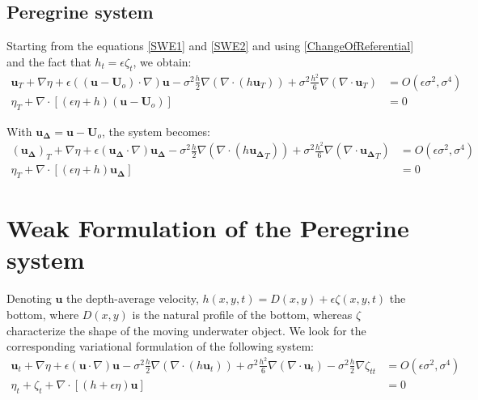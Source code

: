 \documentclass[11pt,a4paper]{article}
\begin{document}
		
		\pagebreak
		
		\subsection{Peregrine system}
			Starting from the equations \eqref{SWE1} and \eqref{SWE2} and using \eqref{ChangeOfReferential} and the fact that $h_t = \epsilon \zeta_t$, we obtain:
			\begin{align}
				\mathbf{u}_T + \nabla \eta		+ \epsilon ((\mathbf{u} - \mathbf{U}_o)\cdot \nabla) \mathbf{u}  - \sigma^2\frac{h}{2}\nabla (\nabla \cdot (h \mathbf{u}_T)) + \sigma^2 \frac{h^2}{6}\nabla (\nabla \cdot \mathbf{u}_T) &= O(\epsilon \sigma^2, \sigma^4)\\
				\eta_T + \nabla \cdot [(\epsilon \eta + h)(\mathbf{u} - \mathbf{U}_o)] &= 0
	\end{align}
	
		With $\mathbf{u_\Delta} = \mathbf{u} - \mathbf{U}_o$, the system becomes:
		\begin{align}
			(\mathbf{u_\Delta})_T + \nabla \eta		+ \epsilon (\mathbf{u_\Delta}\cdot \nabla) \mathbf{u_\Delta} - \sigma^2\frac{h}{2}\nabla (\nabla \cdot (h \mathbf{u_\Delta}_T)) + \sigma^2 \frac{h^2}{6}\nabla (\nabla \cdot \mathbf{u_\Delta}_T) &= O(\epsilon \sigma^2, \sigma^4)\\
			\eta_T + \nabla \cdot [(\epsilon \eta + h)\mathbf{u_\Delta}] &= 0
		\end{align}
		
		\pagebreak
		
	\section{Weak Formulation of the Peregrine system}
	Denoting $\mathbf{u}$ the depth-average velocity, $h(x,y,t) = D(x,y) + \epsilon \zeta(x,y,t)$ the bottom, where  $D(x,y)$ is the natural profile of the bottom, whereas $\zeta$ characterize the shape of the moving underwater object. We look for the corresponding variational formulation of the following system: 
	\begin{align}
		\mathbf{u}_t + \nabla \eta + \epsilon (\mathbf{u} \cdot \nabla)\mathbf{u} - \sigma^2\frac{h}{2}\nabla (\nabla \cdot (h \mathbf{u}_t)) + \sigma^2 \frac{h^2}{6}\nabla (\nabla \cdot \mathbf{u}_t) - \sigma^2\frac{h}{2}\nabla \zeta_{tt}  &= O(\epsilon \sigma^2, \sigma^4) \label{Peregrine1}\\
		\eta_t+\zeta_t + \nabla \cdot [(h+\epsilon\eta)\mathbf{u}] &= 0 \label{Peregrine2}
	\end{align}
		
\end{document}
